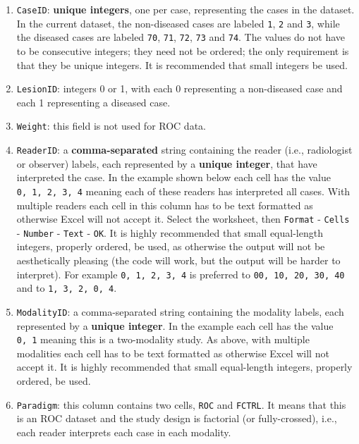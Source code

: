 \documentclass[
]{book}
\begin{document}
\begin{enumerate}
\def\labelenumi{\arabic{enumi}.}
\item
  \texttt{CaseID}: \textbf{unique integers}, one per case, representing the cases in the dataset. In the current dataset, the non-diseased cases are labeled \texttt{1}, \texttt{2} and \texttt{3}, while the diseased cases are labeled \texttt{70}, \texttt{71}, \texttt{72}, \texttt{73} and \texttt{74}. The values do not have to be consecutive integers; they need not be ordered; the only requirement is that they be unique integers. It is recommended that small integers be used.
\item
  \texttt{LesionID}: integers 0 or 1, with each 0 representing a non-diseased case and each 1 representing a diseased case.
\item
  \texttt{Weight}: this field is not used for ROC data.
\item
  \texttt{ReaderID}: a \textbf{comma-separated} string containing the reader (i.e., radiologist or observer) labels, each represented by a \textbf{unique integer}, that have interpreted the case. In the example shown below each cell has the value \texttt{0,\ 1,\ 2,\ 3,\ 4} meaning each of these readers has interpreted all cases. With multiple readers each cell in this column has to be text formatted as otherwise Excel will not accept it. Select the worksheet, then \texttt{Format} - \texttt{Cells} - \texttt{Number} - \texttt{Text} - \texttt{OK}. It is highly recommended that small equal-length integers, properly ordered, be used, as otherwise the output will not be aesthetically pleasing (the code will work, but the output will be harder to interpret). For example \texttt{0,\ 1,\ 2,\ 3,\ 4} is preferred to \texttt{00,\ 10,\ 20,\ 30,\ 40} and to \texttt{1,\ 3,\ 2,\ 0,\ 4}.
\item
  \texttt{ModalityID}: a comma-separated string containing the modality labels, each represented by a \textbf{unique integer}. In the example each cell has the value \texttt{0,\ 1} meaning this is a two-modality study. As above, with multiple modalities each cell has to be text formatted as otherwise Excel will not accept it. It is highly recommended that small equal-length integers, properly ordered, be used.
\item
  \texttt{Paradigm}: this column contains two cells, \texttt{ROC} and \texttt{FCTRL}. It means that this is an ROC dataset and the study design is factorial (or fully-crossed), i.e., each reader interprets each case in each modality.
\end{enumerate}
\end{document}
